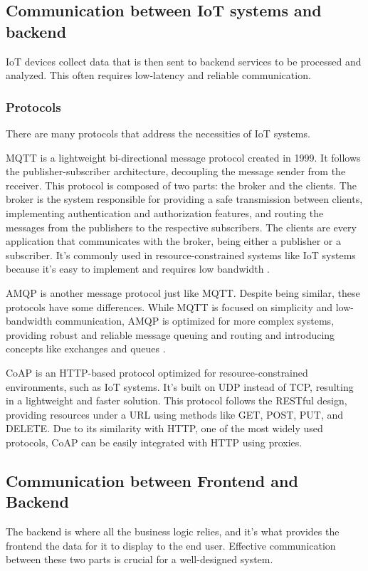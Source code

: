 \subsection{Communication between IoT systems and backend}
\gls{IoT} devices collect data that is then sent to backend services to be processed
and analyzed. This often requires low-latency and reliable communication.
\subsubsection{Protocols}
There are many protocols that address the necessities of \gls{IoT} systems.

MQTT is a lightweight bi-directional message protocol created in 1999.
It follows the publisher-subscriber architecture, decoupling the message
sender from the receiver. This protocol is composed of two parts: the
broker and the clients. The broker is the system responsible for providing
a safe transmission between clients, implementing authentication and
authorization features, and routing the messages from the publishers to
the respective subscribers. The clients are every application that
communicates with the broker, being either a publisher or a subscriber.
It's commonly used in resource-constrained systems like IoT systems because
it's easy to implement and requires low bandwidth \cite{Jayapal2019, CommunicationProtocols}.

\gls{AMQP} is another message protocol just like \gls{MQTT}.
Despite being similar, these protocols have some differences. While \gls{MQTT} is
focused on simplicity and low-bandwidth communication, \gls{AMQP} is optimized for
more complex systems, providing robust and reliable message queuing and
routing and introducing concepts like exchanges and queues \cite{CommunicationProtocols}.

\gls{CoAP} is an \gls{HTTP}-based protocol optimized for resource-constrained
environments, such as \gls{IoT} systems. It's built on \gls{UDP} instead of \gls{TCP},
resulting in a lightweight and faster solution.
This protocol follows the \gls{REST}ful design, providing resources under a \gls{URL}
using methods like GET, POST, PUT, and DELETE. Due to its similarity with
\gls{HTTP}, one of the most widely used protocols, \gls{CoAP} can be easily integrated
with \gls{HTTP} using proxies\cite{coap, Jayapal2019}.

\subsection{Communication between Frontend and Backend}
The backend is where all the business logic relies, and it's what provides the frontend
the data for it to display to the end user. Effective communication between
these two parts is crucial for a well-designed system.
